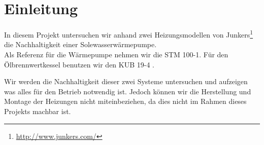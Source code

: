 \chapter{Einleitung}
\label{chap:einleitung}

In diesem Projekt untersuchen wir anhand zwei Heizungsmodellen von Junkers\footnote{\url{http://www.junkers.com/}} die Nachhaltigkeit einer Solewasserwärmepumpe. \\
Als Referenz für die Wärmepumpe nehmen wir die STM 100-1\cite{junkers:stm-100-1}. Für den Ölbrennwertkessel benutzen wir den KUB 19-4 \cite{junkers:kub-19-4}.

Wir werden die Nachhaltigkeit dieser zwei Systeme untersuchen und aufzeigen was alles für den Betrieb notwendig ist. Jedoch können wir die Herstellung und Montage der Heizungen nicht miteinbeziehen, da dies nicht im Rahmen dieses Projekts machbar ist.



